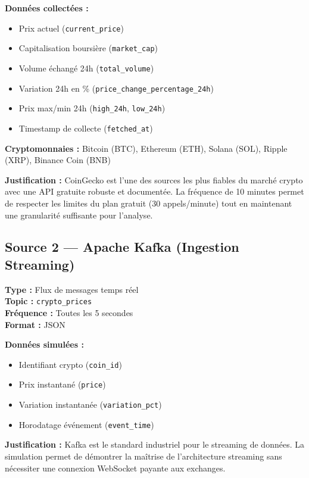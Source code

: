 \documentclass[12pt,a4paper]{article}
\begin{document}
\textbf{Données collectées :}
\begin{itemize}[noitemsep]
    \item Prix actuel (\texttt{current\_price})
    \item Capitalisation boursière (\texttt{market\_cap})
    \item Volume échangé 24h (\texttt{total\_volume})
    \item Variation 24h en \% (\texttt{price\_change\_percentage\_24h})
    \item Prix max/min 24h (\texttt{high\_24h}, \texttt{low\_24h})
    \item Timestamp de collecte (\texttt{fetched\_at})
\end{itemize}

\textbf{Cryptomonnaies :} Bitcoin (BTC), Ethereum (ETH), Solana (SOL), Ripple (XRP), Binance Coin (BNB)

\textbf{Justification :} CoinGecko est l'une des sources les plus fiables du marché crypto avec une API gratuite robuste et documentée. La fréquence de 10 minutes permet de respecter les limites du plan gratuit (30 appels/minute) tout en maintenant une granularité suffisante pour l'analyse.

\subsection{Source 2 — Apache Kafka (Ingestion Streaming)}
\textbf{Type :} Flux de messages temps réel\\
\textbf{Topic :} \texttt{crypto\_prices}\\
\textbf{Fréquence :} Toutes les 5 secondes\\
\textbf{Format :} JSON

\textbf{Données simulées :}
\begin{itemize}[noitemsep]
    \item Identifiant crypto (\texttt{coin\_id})
    \item Prix instantané (\texttt{price})
    \item Variation instantanée (\texttt{variation\_pct})
    \item Horodatage événement (\texttt{event\_time})
\end{itemize}

\textbf{Justification :} Kafka est le standard industriel pour le streaming de données. La simulation permet de démontrer la maîtrise de l'architecture streaming sans nécessiter une connexion WebSocket payante aux exchanges.
\end{document}
